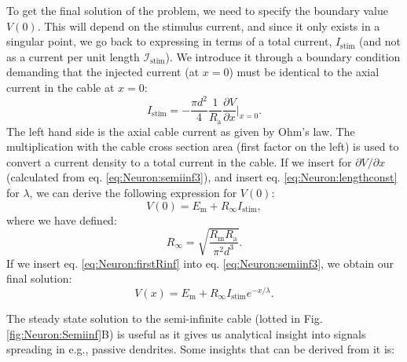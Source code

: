 To get the final solution of the problem, we need to specify the boundary value $V(0)$. This will depend on the stimulus current, and since it only exists in a singular point, we go back to expressing in terms of a total current, $I_\text{stim}$ (and not as a current per unit length $\mathcal{I}_\text{stim}$). We introduce it through a boundary condition demanding that the injected current (at $x=0$) must be identical to the axial current in the cable at $x=0$:
\begin{equation}
I_\text{stim} = - \frac{\pi d^2}{4}\frac{1}{R_\text{a}} \frac{\partial V}{\partial x}   \Big|_{x=0}.
\end{equation}
The left hand side is the axial cable current as given by Ohm's law. The multiplication with the cable cross section area (first factor on the left) is used to convert a current density to a total current in the cable. If we insert for $\partial V/\partial x$ (calculated from eq. \ref{eq:Neuron:semiinf3}), and insert eq. \ref{eq:Neuron:lengthconst} for $\lambda$, we can derive the following expression for $V(0)$:
\begin{equation}
V(0) = E_\text{m} + R_{\infty}I_\text{stim}, 
\label{eq:Neuron:firstRinf}
\end{equation}
where we have defined:
\begin{equation}
R_{\infty} = \sqrt{\frac{R_\text{m} R_\text{a}}{\pi^2 d^3}}.
\label{eq:Neuron:Rinf}
\end{equation}
If we insert eq. \ref{eq:Neuron:firstRinf} into eq. \ref{eq:Neuron:semiinf3}, we obtain our final solution:
\begin{equation}
V(x) = E_\text{m} +R_{\infty}I_\text{stim}  e^{-x/\lambda}.
\label{eq:Neuron:semiinf4}
\end{equation}

The steady state solution to the semi-infinite cable (lotted in Fig. \ref{fig:Neuron:Semiinf}B) is useful as it gives us analytical insight into signals spreading in e.g., passive dendrites. Some insights that can be derived from it is:

